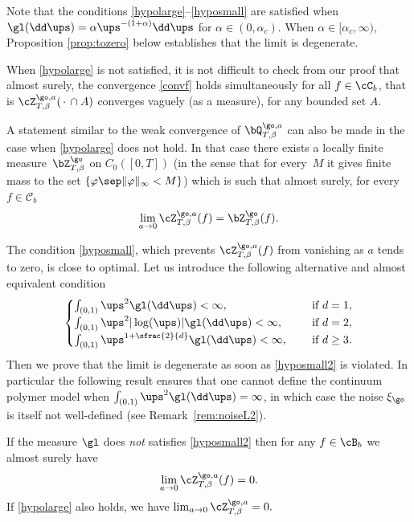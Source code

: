 \begin{rem}
Note that the conditions \eqref{hypolarge}--\eqref{hyposmall} are satisfied when $\gl(\dd \ups)= \alpha \ups^{-(1+\alpha)}\dd \ups$ for $\alpha\in (0,\alpha_c)$. When $\alpha\in [\alpha_c,\infty)$, Proposition \ref{prop:tozero} below establishes that the limit is degenerate.
\end{rem}

\begin{rem}
When \eqref{hypolarge} is not satisfied,
it is not difficult to check from our proof that
almost surely, the convergence \eqref{convf} holds simultaneously for all $f\in \cC_b$, that is $\cZ^{\go,a}_{T,\beta}(\,\cdot\, \cap A)$ converges vaguely (as a measure), for any bounded set $A$.
\end{rem}

\begin{rem}
A statement similar to the weak convergence of $\bQ^{\go,a}_{T,\beta}$ can also be made in the case when \eqref{hypolarge} does not hold.
In that case there exists a locally finite measure~$\bZ^{\go}_{T,\beta}$ on $C_0([0,T])$ (in the sense that for every~$M$ it gives finite mass to the set $\{ \varphi \sep \|\varphi\|_{\infty}<M\}$) which is such that almost surely, for every $f\in \mathcal C_b$
\[
\lim_{a\to 0}\cZ^{\go,a}_{T,\beta}(f)= \bZ^{\go}_{T,\beta}(f).
\]
\end{rem}

 The condition \eqref{hyposmall}, which prevents
$\cZ^{\go,a}_{T,\beta}(f)$ from vanishing as $a$ tends to zero, is close to optimal.
Let us introduce the following alternative and almost equivalent condition
\begin{equation}\label{hyposmall2}
\begin{cases}
\int_{(0,1)} \ups^{2} \gl(\dd \ups)<\infty, \quad &\text{ if } d=1,\\
\int_{(0,1)} \ups^{2}|\log (\ups)| \gl(\dd \ups)<\infty, \quad &\text{ if } d=2,\\
\int_{(0,1)} \ups^{1+\sfrac{2}{d}} \gl(\dd \ups)<\infty, \quad &\text{ if } d\ge 3.
\end{cases}
\end{equation}
Then we prove that the limit is degenerate as soon as \eqref{hyposmall2} is violated.
In particular the following result ensures
that one cannot define the continuum polymer model when
$\int_{(0,1)} \ups^{2} \gl(\dd \ups) =\infty$,
in which case
the noise $\xi_\go$ is itself not well-defined (see Remark~\ref{rem:noiseL2}).

\begin{proposition}\label{prop:tozero}
If the measure $\gl$ does \emph{not} satisfies \eqref{hyposmall2} then for any $f\in \cB_b$ we almost surely have
\begin{equation}
\lim_{a\to 0} \cZ^{\go,a}_{T,\beta}(f)=0.
\end{equation}
If \eqref{hypolarge} also holds, we have $ \lim_{a\to 0} \cZ^{\go,a}_{T,\beta}=0.$
\end{proposition}

